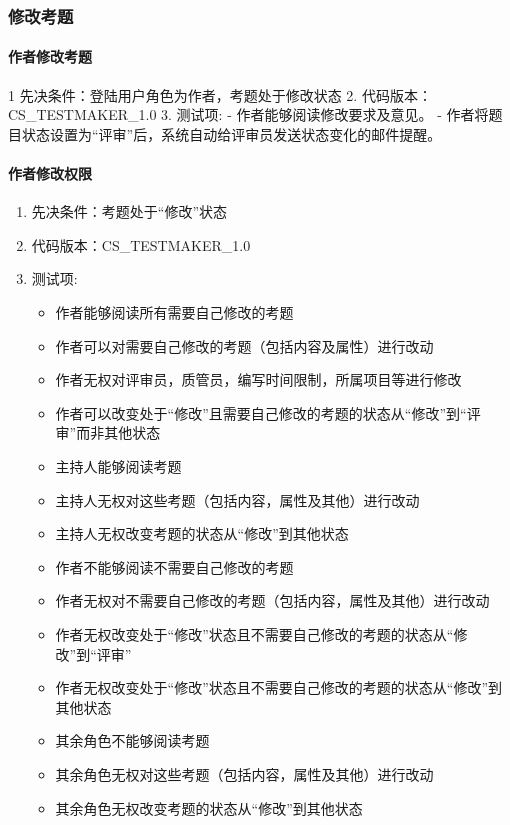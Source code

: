 \documentclass[hyperref, a4paper]{ctexart}
\providecommand{\tightlist}{%
  \setlength{\itemsep}{0pt}\setlength{\parskip}{0pt}}
\let\oldparagraph\paragraph
\renewcommand{\paragraph}[1]{\oldparagraph{#1}\mbox{}}
\begin{document}
\hypertarget{ux4feeux6539ux8003ux9898}{%
\subsubsection{修改考题}\label{ux4feeux6539ux8003ux9898}}

\hypertarget{ux4f5cux8005ux4feeux6539ux8003ux9898}{%
\paragraph{作者修改考题}\label{ux4f5cux8005ux4feeux6539ux8003ux9898}}

1 先决条件：登陆用户角色为作者，考题处于修改状态 2.
代码版本：CS\_TESTMAKER\_1.0 3. 测试项: - 作者能够阅读修改要求及意见。 -
作者将题目状态设置为``评审''后，系统自动给评审员发送状态变化的邮件提醒。

\hypertarget{ux4f5cux8005ux4feeux6539ux6743ux9650}{%
\paragraph{作者修改权限}\label{ux4f5cux8005ux4feeux6539ux6743ux9650}}

\begin{enumerate}
\def\labelenumi{\arabic{enumi}.}
\tightlist
\item
  先决条件：考题处于``修改''状态
\item
  代码版本：CS\_TESTMAKER\_1.0
\item
  测试项:

  \begin{itemize}
  \tightlist
  \item
    作者能够阅读所有需要自己修改的考题
  \item
    作者可以对需要自己修改的考题（包括内容及属性）进行改动
  \item
    作者无权对评审员，质管员，编写时间限制，所属项目等进行修改
  \item
    作者可以改变处于``修改''且需要自己修改的考题的状态从``修改''到``评审''而非其他状态
  \item
    主持人能够阅读考题
  \item
    主持人无权对这些考题（包括内容，属性及其他）进行改动
  \item
    主持人无权改变考题的状态从``修改''到其他状态
  \item
    作者不能够阅读不需要自己修改的考题
  \item
    作者无权对不需要自己修改的考题（包括内容，属性及其他）进行改动
  \item
    作者无权改变处于``修改''状态且不需要自己修改的考题的状态从``修改''到``评审''
  \item
    作者无权改变处于``修改''状态且不需要自己修改的考题的状态从``修改''到其他状态
  \item
    其余角色不能够阅读考题
  \item
    其余角色无权对这些考题（包括内容，属性及其他）进行改动
  \item
    其余角色无权改变考题的状态从``修改''到其他状态
  \end{itemize}
\end{enumerate}
\end{document}
